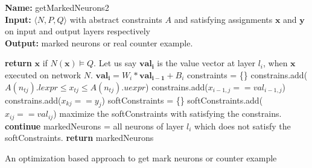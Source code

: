 \begin{algorithm}[t]
  \textbf{Name: } getMarkedNeurons2 \\
  \textbf{Input: } $\langle N,P,Q \rangle$ with abstract constraints $A$ and satisfying assignments $\boldsymbol{x}$ and $\boldsymbol{y}$ on input and output layers respectively\\
  \textbf{Output: } marked neurons or real counter example. 
  \begin{algorithmic}[1]
    \State \textbf{return} $\boldsymbol{x}$ if $N(\boldsymbol{x}) \models Q$. 
    \State Let us say $\boldsymbol{val_{i}}$ is the value vector at layer $l_i$, when $\boldsymbol{x}$ executed on network $N$. 
     
        \State $\boldsymbol{val_i} = W_i * \boldsymbol{val_{i-1}} + B_i$ 
      \Else {}
        \State constraints = \{\}
            \State constrains.add($A(n_{tj}).lexpr \leq x_{tj}\leq A(n_{tj}).uexpr$)
          \EndFor
        \EndFor
          \State constrains.add($x_{i-1,j} == val_{i-1,j}$)
        \EndFor
          \State constrains.add($x_{kj} == y_{j}$)
        \EndFor
        softConstraints = \{\}
          \State softConstraints.add($x_{ij} == val_{ij}$)
        \EndFor
        \State maximize the softConstraints with satisfying the constrains. 
          \State \textbf{continue}
        \Else
          \State markedNeurons = all neurons of layer $l_i$ which does not satisfy the softConstraints. 
          \State \textbf{return} markedNeurons
        \EndIf 
      \EndIf
    \EndFor
  \end{algorithmic}
  \caption{An optimization based approach to get mark neurons or counter example}
  \label{algo:refine2}
\end{algorithm}







